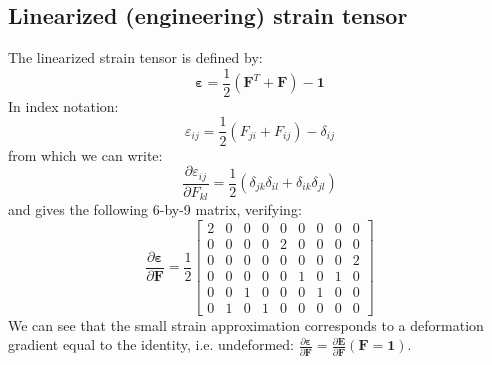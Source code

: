 \documentclass[letterpaper,12pt,oneside]{report}
\begin{document}
\subsection{Linearized (engineering) strain tensor}
The linearized strain tensor is defined by:
\begin{equation}
\boldsymbol{\varepsilon} = \frac{1}{2}\left(\mathbf{F}^T + \mathbf{F}\right) - \mathbf{1}
\end{equation}
In index notation:
\begin{equation}
\varepsilon_{ij} = \frac{1}{2}\left(F_{ji} + F_{ij}\right) - \delta_{ij}
\end{equation}
from which we can write:
\begin{equation}
\frac{\partial \varepsilon_{ij}}{\partial F_{kl}} = \frac{1}{2}\left(\delta_{jk}\delta_{il} + \delta_{ik}\delta_{jl} \right)
\end{equation}
and gives the following 6-by-9 matrix, verifying:
\begin{equation}
\frac{\partial \boldsymbol{\varepsilon}}{\partial \mathbf{F}} = \frac{1}{2}
\left[\begin{array}{ccccccccc}
2 & 0 & 0 & 0 & 0 & 0 & 0 & 0 & 0 \\
0 & 0 & 0 & 0 & 2 & 0 & 0 & 0 & 0 \\
0 & 0 & 0 & 0 & 0 & 0 & 0 & 0 & 2 \\
0 & 0 & 0 & 0 & 0 & 1 & 0 & 1 & 0 \\
0 & 0 & 1 & 0 & 0 & 0 & 1 & 0 & 0 \\
0 & 1 & 0 & 1 & 0 & 0 & 0 & 0 & 0
\end{array}\right]
\end{equation}
We can see that the small strain approximation corresponds to a deformation gradient equal to the identity, i.e. undeformed: $\frac{\partial \boldsymbol{\varepsilon}}{\partial \mathbf{F}} = \frac{\partial \mathbf{E}}{\partial \mathbf{F}}(\mathbf{F}=\mathbf{1})$.
\end{document}
